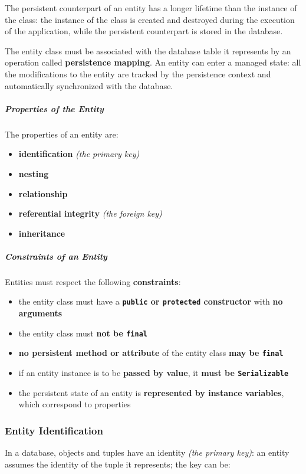 \documentclass[english]{article}
\begin{document}
The persistent counterpart of an entity has a longer lifetime than the instance of the class:
the instance of the class is created and destroyed during the execution of the application, while the persistent counterpart is stored in the database.

The entity class must be associated with the database table it represents by an operation called \textbf{persistence mapping}.
An entity can enter a managed state: all the modifications to the entity are tracked by the persistence context and automatically synchronized with the database.

\subparagraph*{Properties of the Entity}
The properties of an entity are:

\begin{itemize}
  \item \textbf{identification} \textit{(the primary key)}
  \item \textbf{nesting}
  \item \textbf{relationship}
  \item \textbf{referential integrity} \textit{(the foreign key)}
  \item \textbf{inheritance}
\end{itemize}

\subparagraph*{Constraints of an Entity}

Entities must respect the following \textbf{constraints}:

\begin{itemize}
  \item the entity class must have a \textbf{\texttt{public} or \texttt{protected} constructor} with \textbf{no arguments}
  \item the entity class must \textbf{not be \texttt{final}}
  \item \textbf{no persistent method or attribute} of the entity class \textbf{may be \texttt{final}}
  \item if an entity instance is to be \textbf{passed by value}, it \textbf{must be \texttt{Serializable}}
  \item the persistent state of an entity is \textbf{represented by instance variables}, which correspond to \javab properties
\end{itemize}

\subsubsection{Entity Identification}
In a database, objects and tuples have an identity \textit{(the primary key)}: an entity assumes the identity of the tuple it represents;
the key can be:
\end{document}
